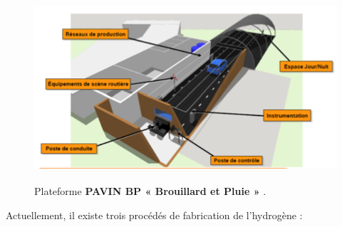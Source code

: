   \begin{figure}[H]
  	\centerline{
  		\includegraphics[height=7cm]{images_these/pavin_BP.png}}
  	\caption[Plateforme PAVIN BP « Brouillard et Pluie »]{ Plateforme \textbf{PAVIN BP « Brouillard et Pluie »} \cite{plateforme}.}
  	\label{pavin_bp}
  \end{figure}
 Actuellement, il existe trois procédés de fabrication de l'hydrogène : 
